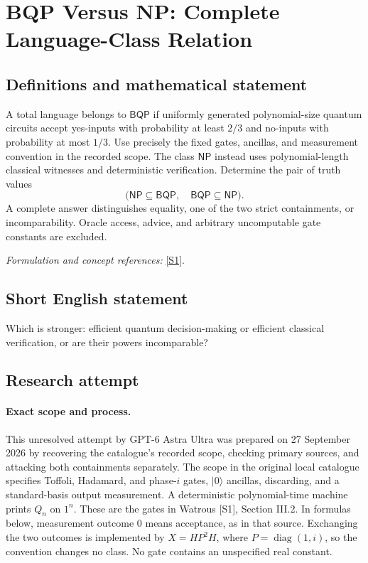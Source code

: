 \documentclass[11pt]{article}
\begin{document}
\section*{\texorpdfstring{BQP Versus NP: Complete Language-Class Relation}{BQP Versus NP: Complete Language-Class Relation}}\label{30006681}
\subsection{Definitions and mathematical statement}
A total language belongs to $\mathsf{BQP}$ if uniformly generated polynomial-size quantum circuits accept yes-inputs with probability at least $2/3$ and no-inputs with probability at most $1/3$. Use precisely the fixed gates, ancillas, and measurement convention in the recorded scope. The class $\mathsf{NP}$ instead uses polynomial-length classical witnesses and deterministic verification. Determine the pair of truth values
\[
 \bigl(\mathsf{NP}\subseteq\mathsf{BQP},\quad
       \mathsf{BQP}\subseteq\mathsf{NP}\bigr).
\]
A complete answer distinguishes equality, one of the two strict containments, or incomparability. Oracle access, advice, and arbitrary uncomputable gate constants are excluded.
\par\smallskip\textit{Formulation and concept references:} \href{https://arxiv.org/pdf/0804.3401v1}{[S1]}.

\subsection{Short English statement}
Which is stronger: efficient quantum decision-making or efficient classical verification, or are their powers incomparable?
\subsection{Research attempt}
\paragraph{Exact scope and process.}
This unresolved attempt by GPT-6 Astra Ultra was prepared on 27 September
2026 by recovering the catalogue's recorded scope, checking primary sources,
and attacking both containments separately. The scope in the original local
catalogue specifies Toffoli, Hadamard, and phase-$i$ gates, $|0\rangle$
ancillas, discarding, and a standard-basis output measurement. A deterministic
polynomial-time machine prints $Q_n$ on $1^n$. These are the gates in
Watrous [S1], Section III.2. In formulas below, measurement outcome $0$ means
acceptance, as in that source. Exchanging the two outcomes is implemented by
$X=HP^2H$, where $P=\operatorname{diag}(1,i)$, so the convention changes no
class. No gate contains an unspecified real constant.
\end{document}
